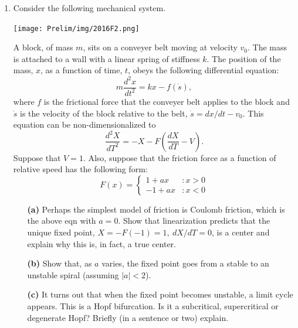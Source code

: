 \documentclass[10pt,letterpaper]{report}
\newcommand{\abs}[1]{\left|{#1}\right|}
\begin{document}
\begin{enumerate}
\item
\begin{qbox}
Consider the following mechanical system.
\begin{center}
\texttt{[image: Prelim/img/2016F2.png]}
\end{center}
A block, of mass $m$, sits on a conveyer belt moving at velocity $v_0$. The mass is attached to a wall with a linear spring of stiffness $k$. The position of the mass, $x$, as a function of time, $t$, obeys the following differential equation:
\[
m \frac{d^2 x}{dt^2} = kx - f(\dot s),
\]
where $f$ is the frictional force that the conveyer belt applies to the block and $\dot s$ is the velocity of the block relative to the belt, $\dot s = dx/dt - v_0$. This equation can be non-dimensionalized to
\[
\frac{d^2X}{dT^2} = -X - F\left(\frac{dX}{dT} - V\right).
\]
Suppose that $V = 1$. Also, suppose that the friction force as a function of relative speed has the following form:
\[
F(x) = \begin{cases}
1 + ax &: x > 0 \\
-1 + ax &: x < 0
\end{cases}
\]
\begin{itemize}
    \item[\textbf{(a)}] Perhaps the simplest model of friction is Coulomb friction, which is the above eqn with $a = 0$. Show that linearization predicts that the unique fixed point, $X = -F(-1) = 1,\ dX/dT = 0$, is a center and explain why this is, in fact, a true center.
    
    \item[\textbf{(b)}] Show that, as $a$ varies, the fixed point goes from a stable to an unstable spiral (assuming $\abs a < 2$).
    
    \item[\textbf{(c)}] It turns out that when the fixed point becomes unstable, a limit cycle appears. This is a Hopf bifurcation. Is it a subcritical, supercritical or degenerate Hopf? Briefly (in a sentence or two) explain.
\end{itemize}
\end{qbox}


\end{enumerate}
\end{document}

